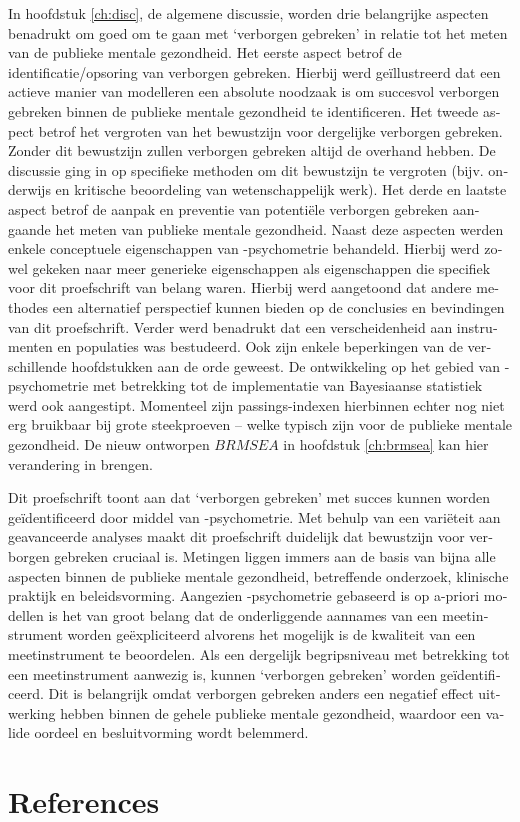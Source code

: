 \begin{otherlanguage}{dutch}
In hoofdstuk \ref{ch:disc}, de algemene discussie, worden drie belangrijke aspecten benadrukt om goed om te gaan met `verborgen gebreken' in relatie tot het meten van de publieke mentale gezondheid. Het eerste aspect betrof de identificatie/opsoring van verborgen gebreken. Hierbij werd ge\"illustreerd dat een actieve manier van modelleren een absolute noodzaak is om succesvol verborgen gebreken binnen de publieke mentale gezondheid te identificeren. Het tweede aspect betrof het vergroten van het bewustzijn voor dergelijke verborgen gebreken. Zonder dit bewustzijn zullen verborgen gebreken altijd de overhand hebben. De discussie ging in op specifieke methoden om dit bewustzijn te vergroten (bijv. onderwijs en kritische beoordeling van wetenschappelijk werk). Het derde en laatste aspect betrof de aanpak en preventie van potenti\"ele verborgen gebreken aangaande het meten van publieke mentale gezondheid. Naast deze aspecten werden enkele conceptuele eigenschappen van \textbeta-psychometrie behandeld. Hierbij werd zowel gekeken naar meer generieke eigenschappen als eigenschappen die specifiek voor dit proefschrift van belang waren. Hierbij werd aangetoond dat andere methodes een alternatief perspectief kunnen bieden op de conclusies en bevindingen van dit proefschrift. Verder werd benadrukt dat een verscheidenheid aan instrumenten en populaties was bestudeerd. Ook zijn enkele beperkingen van de verschillende hoofdstukken aan de orde geweest. De ontwikkeling op het gebied van \textbeta-psychometrie met betrekking tot de implementatie van Bayesiaanse statistiek werd ook aangestipt. Momenteel zijn passings-indexen hierbinnen echter nog niet erg bruikbaar bij grote steekproeven -- welke typisch zijn voor de publieke mentale gezondheid. De nieuw ontworpen $BRMSEA$ in hoofdstuk \ref{ch:brmsea} kan hier verandering in brengen.

Dit proefschrift toont aan dat `verborgen gebreken' met succes kunnen worden ge\"identificeerd door middel van \textbeta-psychometrie. Met behulp van een vari\"eteit aan geavanceerde analyses maakt dit proefschrift duidelijk dat bewustzijn voor verborgen gebreken cruciaal is. Metingen liggen immers aan de basis van bijna alle aspecten binnen de publieke mentale gezondheid, betreffende onderzoek, klinische praktijk en beleidsvorming. Aangezien \textbeta-psychometrie gebaseerd is op a-priori modellen is het van groot belang dat de onderliggende aannames van een meetinstrument worden ge\"expliciteerd alvorens het mogelijk is de kwaliteit van een meetinstrument te beoordelen. Als een dergelijk begripsniveau met betrekking tot een meetinstrument aanwezig is, kunnen `verborgen gebreken' worden ge\"identificeerd. Dit is belangrijk omdat verborgen gebreken anders een negatief effect uitwerking hebben binnen de gehele publieke mentale gezondheid, waardoor een valide oordeel en besluitvorming wordt belemmerd.

\sloppy
\section*{References}
\printbibliography[heading=none]

\fussy
\end{otherlanguage}
